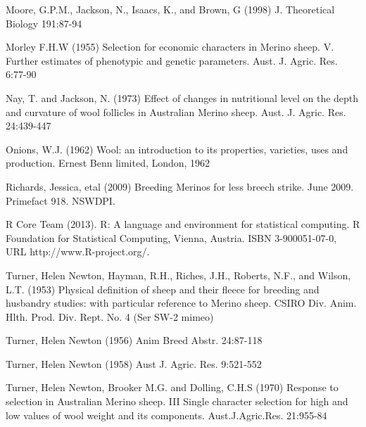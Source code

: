 \documentclass[titlepage]{article}  %
\begin{document}
\begin{thebibliography}{99}
Moore, G.P.M., Jackson, N., Isaacs, K., and Brown, G (1998) J. Theoretical Biology 191:87-94

Morley F.H.W (1955) Selection for economic characters in Merino sheep. V. Further estimates of phenotypic and genetic parameters. Aust. J. Agric. Res. 6:77-90

Nay, T. and Jackson, N. (1973) Effect of changes in nutritional level on the depth and curvature of wool follicles in Australian Merino sheep. Aust. J. Agric. Res. 24:439-447

Onions, W.J. (1962) Wool: an introduction to its properties, varieties, uses
     and production. Ernest Benn limited, London, 1962

Richards, Jessica, etal (2009) Breeding Merinos for less breech strike. June 2009. Primefact 918. NSWDPI.

R Core Team (2013). R: A language and environment for statistical
  computing. R Foundation for Statistical Computing, Vienna, Austria.
  ISBN 3-900051-07-0, URL http://www.R-project.org/.

Turner, Helen Newton, Hayman, R.H., Riches, J.H., Roberts, N.F., and Wilson, L.T. (1953) Physical definition of sheep and their fleece for breeding and husbandry studies: with particular reference to Merino sheep. CSIRO Div. Anim. Hlth. Prod. Div. Rept. No. 4 (Ser SW-2 mimeo)

Turner, Helen Newton (1956) Anim Breed Abstr. 24:87-118

Turner, Helen Newton (1958) Aust J. Agric. Res. 9:521-552

Turner, Helen Newton, Brooker M.G. and Dolling, C.H.S (1970) Response to selection in Australian Merino sheep. III Single character selection for high and low values of wool weight and its components. Aust.J.Agric.Res. 21:955-84
\end{thebibliography}
\end{document}
